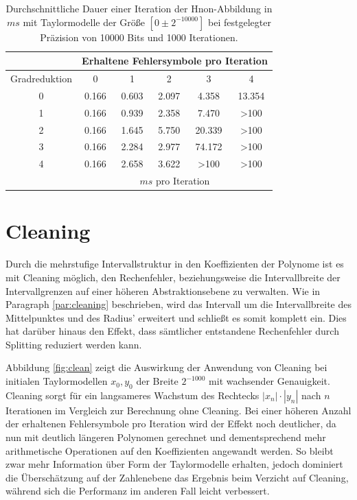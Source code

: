   
 \begin{table}[tbh]
\centering
\begin{tabular}{|c||c|c|c|c|c|}
\hline
&\multicolumn{5}{c|}{Erhaltene Fehlersymbole pro Iteration} \\
\hline
Gradreduktion & 0 & 1 &2& 3 & 4\\
\hline
0& 0.166& 0.603&    2.097&   4.358&    13.354\\
1& 0.166& 0.939&   2.358&  7.470&   >100\\
2& 0.166& 1.645&     5.750&   20.339 &    >100\\
3& 0.166& 2.284&     2.977&   74.172&    >100\\
4&0.166& 2.658&    3.622&   >100    &   >100\\
\hline 
&\multicolumn{5}{c|}{$ms$ pro Iteration} \\
\hline
\end{tabular}

\caption[Experimentelle Ergebnisse zu erhaltenen Fehlersymbolen]{Durchschnittliche Dauer einer Iteration der H\e non-Abbildung in $ms$ mit Taylormodelle der Größe $[0\pm 2^{-10000}]$ bei festgelegter Präzision von 10000 Bits und 1000 Iterationen.}
\label{tab:time}
\end{table}
 
 
 \section{Cleaning}
 Durch die mehrstufige Intervallstruktur in den Koeffizienten der Polynome ist es mit Cleaning möglich, den Rechenfehler, beziehungsweise die Intervallbreite der Intervallgrenzen auf einer höheren Abstraktionsebene zu verwalten. Wie in Paragraph \ref{par:cleaning} beschrieben, wird das Intervall um die Intervallbreite des Mittelpunktes und des Radius' erweitert und schließt es somit komplett ein. Dies hat darüber hinaus den Effekt, dass sämtlicher entstandene Rechenfehler durch Splitting reduziert werden kann. 
 
 
 Abbildung \ref{fig:clean} zeigt die Auswirkung der Anwendung von Cleaning bei initialen Taylormodellen $x_0, y_0$ der Breite $2^{-1000}$ mit wachsender Genauigkeit. Cleaning sorgt für ein langsameres Wachstum des Rechtecks $|x_n|\cdot|y_n|$ nach $n$ Iterationen im Vergleich zur Berechnung ohne Cleaning. Bei einer höheren Anzahl der erhaltenen Fehlersymbole pro Iteration wird der Effekt noch deutlicher, da nun mit deutlich längeren Polynomen gerechnet und dementsprechend mehr arithmetische Operationen auf den Koeffizienten angewandt werden. So bleibt zwar mehr Information über Form der Taylormodelle erhalten, jedoch dominiert die Überschätzung auf der Zahlenebene das Ergebnis beim Verzicht auf Cleaning, während sich die Performanz im anderen Fall leicht verbessert.
 

